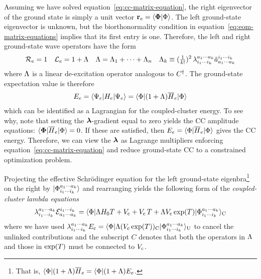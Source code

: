 \documentclass[11pt]{article}
\numberwithin{equation}{section}
\begin{document}
\begin{dfn}
Assuming we have solved equation~\ref{eq:cc-matrix-equation}, the right eigenvector of the ground state is simply a unit vector
$
  \mathbf{r}_e
=
  \langle\mathbf{\Phi }|\Phi \rangle
$.
The left ground-state eigenvector is unknown, but the biorthonormality condition in equation~\ref{eq:eom-matrix-equations} implies that its first entry is one.
Therefore, the left and right ground-state wave operators have the form
\begin{align}
  \mathcal{R}_e
=
  1
&&
  \mathcal{L}_e
=
  1
+
  \Lambda 
&&
  \Lambda 
=
  \Lambda _1
+
  \cdots
+
  \Lambda _n
&&
  \Lambda _k
\equiv
  (\tfrac{1}{k!})^2\,
  \lambda _{i_1\cdots i_k}^{a_1\cdots a_k}
  \tilde{a}^{i_1\cdots i_k}_{a_1\cdots a_k}
\end{align}
where $\Lambda $ is a linear de-excitation operator analogous to $C^\dagger$.
The ground-state expectation value is therefore
\begin{align}
  E_e
=
  \langle\Psi _e|H_e|\Psi _e\rangle
=
  \langle\Phi |
    (
      1
    +
      \Lambda 
    )
    \overline{H}_e
  |\Phi \rangle
\end{align}
which can be identified as a Lagrangian for the coupled-cluster energy.
To see why, note that setting the $\bm{\la}$-gradient equal to zero yields the CC amplitude equations: $\langle\mathbf{\Phi }|\overline{H}_e|\Phi \rangle=0$.
If these are satisfied, then
$
  E_e
=
  \langle\Phi |\overline{H}_e|\Phi \rangle
$
gives the CC energy.
Therefore, we can view the $\bm{\la}$ as Lagrange multipliers enforcing equation~\ref{eq:cc-matrix-equation} and reduce ground-state CC to a constrained optimization problem.
\end{dfn}

\begin{dfn}
Projecting the effective Schr\"odinger equation for the left ground-state eigenbra\footnote{
That is, 
$
  \langle\Phi |
  (
    1
  +
    \Lambda 
  )
  \overline{H}_e
=
  \langle\Phi |
  (
    1
  +
    \Lambda 
  )
  E_e
$.
}
on the right by $|\Phi _{i_1\cdots i_k}^{a_1\cdots a_k}\rangle$
and rearranging yields the following form of the \textit{coupled-cluster lambda equations}
\begin{align}
  \lambda _{i_1\cdots i_k}^{a_1\cdots a_k}
  \mathcal{E}_{a_1\cdots a_k}^{i_1\cdots i_k}
=
  \langle\Phi |
  \Lambda 
  H_0
  T
+
  V_{\mathrm{c}}
+
  V_{\mathrm{c}}\,
  T
+
  \Lambda 
  V_{\mathrm{c}}\,
  \mathrm{exp}(T)
  |\Phi _{i_1\cdots i_k}^{a_1\cdots a_k}\rangle_{\mathrm{C}}
\end{align}
where we have used $\lambda _{i_1\cdots i_k}^{a_1\cdots a_k}E_{\mathrm{c}}=\langle\Phi |\Lambda (V_{\mathrm{c}}\,\mathrm{exp}(T))_{\mathrm{C}}|\Phi _{i_1\cdots i_k}^{a_1\cdots a_k}\rangle_{\mathrm{U}}$ to cancel the unlinked contributions and the subscript $C$ denotes that both the operators in $\Lambda $ and those in $\mathrm{exp}(T)$ must be connected to $V_{\mathrm{c}}$.
\end{dfn}
\end{document}
